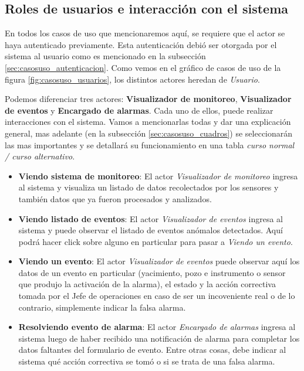 \subsection{Roles de usuarios e interacción con el sistema}

\par En todos los casos de uso que mencionaremos aquí, se requiere que el actor se haya autenticado previamente. Esta autenticación debió ser otorgada por el sistema al usuario como es mencionado en la subsección \ref{sec:casosuso_autenticacion}. Como vemos en el gráfico de casos de uso de la figura \ref{fig:casosuso_usuarios}, los distintos actores heredan de \textit{Usuario}.

\par Podemos diferenciar tres actores: \textbf{Visualizador de monitoreo}, \textbf{Visualizador de eventos} y \textbf{Encargado de alarmas}. Cada uno de ellos, puede realizar interacciones con el sistema. Vamos a mencionarlas todas y dar una explicación general,  mas adelante (en la subsección \ref{sec:casosuso_cuadros}) se seleccionarán las mas importantes y se detallará su funcionamiento en una tabla \textit{curso normal / curso alternativo}.

\begin{itemize}
  \item \textbf{Viendo sistema de monitoreo}: El actor \textit{Visualizador de monitoreo} ingresa al sistema y visualiza un listado de datos recolectados por los sensores y también datos que ya fueron procesados y analizados.
  \item \textbf{Viendo listado de eventos}: El actor \textit{Visualizador de eventos} ingresa al sistema y puede observar el listado de eventos anómalos detectados. Aquí podrá hacer click sobre alguno en particular para pasar a \textit{Viendo un evento}.
  \item \textbf{Viendo un evento}: El actor \textit{Visualizador de eventos} puede observar aquí los datos de un evento en particular (yacimiento, pozo e instrumento o sensor que produjo la activación de la alarma), el estado y la acción correctiva tomada por el Jefe de operaciones en caso de ser un incoveniente real o de lo contrario, simplemente indicar la falsa alarma.
  \item \textbf{Resolviendo evento de alarma}: El actor \textit{Encargado de alarmas} ingresa al sistema luego de haber recibido una notificación de alarma para completar los datos faltantes del formulario de evento. Entre otras cosas, debe indicar al sistema qué acción correctiva se tomó o si se trata de una falsa alarma.
\end{itemize}

